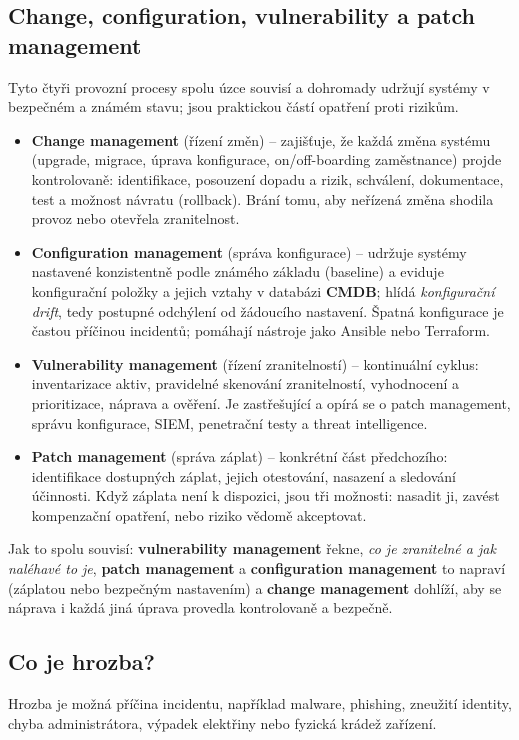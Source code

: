 \subsection*{Change, configuration, vulnerability a patch management}
Tyto čtyři provozní procesy spolu úzce souvisí a dohromady udržují systémy v bezpečném a známém stavu; jsou praktickou částí opatření proti rizikům.
\begin{itemize}
  \item \textbf{Change management} (řízení změn) -- zajišťuje, že každá změna systému (upgrade, migrace, úprava konfigurace, on/off-boarding zaměstnance) projde kontrolovaně: identifikace, posouzení dopadu a rizik, schválení, dokumentace, test a možnost návratu (rollback). Brání tomu, aby neřízená změna shodila provoz nebo otevřela zranitelnost.
  \item \textbf{Configuration management} (správa konfigurace) -- udržuje systémy nastavené konzistentně podle známého základu (baseline) a eviduje konfigurační položky a jejich vztahy v databázi \textbf{CMDB}; hlídá \emph{konfigurační drift}, tedy postupné odchýlení od žádoucího nastavení. Špatná konfigurace je častou příčinou incidentů; pomáhají nástroje jako Ansible nebo Terraform.
  \item \textbf{Vulnerability management} (řízení zranitelností) -- kontinuální cyklus: inventarizace aktiv, pravidelné skenování zranitelností, vyhodnocení a prioritizace, náprava a ověření. Je zastřešující a opírá se o patch management, správu konfigurace, SIEM, penetrační testy a threat intelligence.
  \item \textbf{Patch management} (správa záplat) -- konkrétní část předchozího: identifikace dostupných záplat, jejich otestování, nasazení a sledování účinnosti. Když záplata není k dispozici, jsou tři možnosti: nasadit ji, zavést kompenzační opatření, nebo riziko vědomě akceptovat.
\end{itemize}
Jak to spolu souvisí: \textbf{vulnerability management} řekne, \emph{co je zranitelné a jak naléhavé to je}, \textbf{patch management} a \textbf{configuration management} to napraví (záplatou nebo bezpečným nastavením) a \textbf{change management} dohlíží, aby se náprava i každá jiná úprava provedla kontrolovaně a bezpečně.

\subsection*{Co je hrozba?}

Hrozba je možná příčina incidentu, například malware, phishing, zneužití identity, chyba administrátora, výpadek elektřiny nebo fyzická krádež zařízení.

